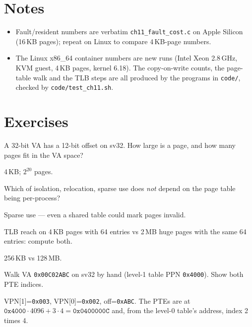 \section*{Notes}
\label{sec:notes11}
\begin{itemize}
\item Fault/resident numbers are verbatim
      \texttt{ch11\_fault\_cost.c} on Apple Silicon (16\,KB pages);
      repeat on Linux to compare 4\,KB-page numbers.
\item The Linux x86\_64 container numbers are new runs (Intel Xeon
      2.8\,GHz, KVM guest, 4\,KB pages, kernel 6.18). The copy-on-write
      counts, the page-table walk and the TLB steps are all produced by
      the programs in \texttt{code/}, checked by \texttt{code/test\_ch11.sh}.
\end{itemize}

\section*{Exercises}

\begin{exercise}[easy]
A 32-bit VA has a 12-bit offset on sv32. How large is a page, and
how many pages fit in the VA space?
\end{exercise}
\begin{solution}[hint]
4\,KB; $2^{20}$ pages.
\end{solution}

\begin{exercise}[easy]
Which of isolation, relocation, sparse use does \emph{not} depend on
the page table being per-process?
\end{exercise}
\begin{solution}[hint]
Sparse use --- even a shared table could mark pages invalid.
\end{solution}

\begin{exercise}[easy]
TLB reach on 4\,KB pages with 64 entries vs 2\,MB huge pages with
the same 64 entries: compute both.
\end{exercise}
\begin{solution}[hint]
256\,KB vs 128\,MB.
\end{solution}

\begin{exercise}[medium]
Walk VA \texttt{0x00C02ABC} on sv32 by hand (level-1 table PPN
\texttt{0x4000}). Show both PTE indices.
\end{exercise}
\begin{solution}[hint]
VPN[1]=\texttt{0x003}, VPN[0]=\texttt{0x002}, off=\texttt{0xABC}. The PTEs are at $\texttt{0x4000}\cdot4096+3\cdot4=\texttt{0x0400000C}$ and, from the level-0 table's address, index 2 times 4.
\end{solution}


